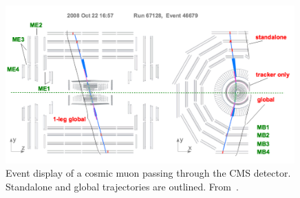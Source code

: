 \begin{figure}[h]
\begin{center}
\includegraphics[width=0.99\textwidth]{Chapters/xLHCMS/CosmicMuons.png}
\caption{Event display of a cosmic muon passing through the CMS
  detector. Standalone and global trajectories are
  outlined. From~\cite{Chatrchyan:2009ae}.} 
\label{fig:cosmicmuon}
\end{center}
\end{figure}

